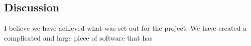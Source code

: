 \documentclass{article}
\begin{document}
\subsection{Discussion}
I believe we have achieved what was set out for the project. We have created a
complicated and large piece of software that has 


\clearpage



\end{document}
